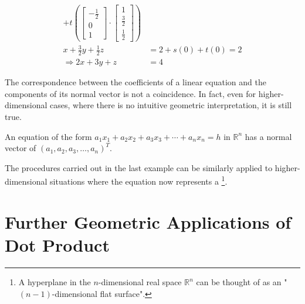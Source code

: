 \begin{solution}
\begin{align*}
+ t
\left(\begin{bmatrix}
-\frac{1}{2} \\
0 \\
1
\end{bmatrix}
\cdot
\begin{bmatrix}
1 \\
\frac{3}{2} \\
\frac{1}{2}
\end{bmatrix}\right) \\
x + \frac{3}{2}y + \frac{1}{2}z &= 2 + s(0) + t(0) = 2 \\
\Rightarrow 2x+3y+z &= 4 
\end{align*}
\end{solution}
The correspondence between the coefficients of a linear equation and the components of its normal vector is not a coincidence. In fact, even for higher-dimensional cases, where there is no intuitive geometric interpretation, it is still true.
\begin{proper}
\label{proper:normalhyperplane}
An equation of the form $a_1x_1 + a_2x_2 + a_3x_3 + \cdots + a_nx_n = h$ in $\mathbb{R}^n$ has a normal vector of $(a_1, a_2, a_3, \ldots, a_n)^T$.
\end{proper}
The procedures carried out in the last example can be similarly applied to higher-dimensional situations where the equation now represents a \footnote{A hyperplane in the $n$-dimensional real space $\mathbb{R}^n$ can be thought of as an "$(n-1)$-dimensional flat surface".}.

\section{Further Geometric Applications of Dot Product}
